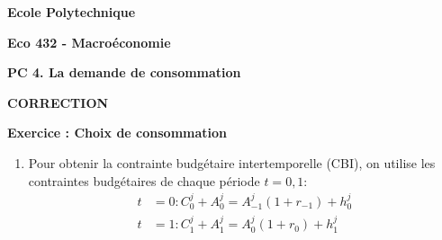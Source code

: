 \documentclass[a4paper,11pt]{article}
\begin{document}
\begin{center}
\textbf{Ecole Polytechnique}

\bigskip

\textbf{Eco 432 - Macroéconomie}

\bigskip

\textbf{PC 4. La demande de consommation}

\bigskip

\textbf{CORRECTION}
\end{center}


\bigskip


\noindent \textbf{Exercice : Choix de consommation}

\smallskip


\begin{enumerate}
\item  Pour obtenir la contrainte budgétaire intertemporelle (CBI), on utilise
les contraintes budgétaires de chaque période $t=0,1$:
\begin{align*}
t& =0:C_{0}^{j}+A_{0}^{j}=A_{-1}^{j}\left( 1+r_{-1}\right) + h^j_0 \\
t& =1:C_{1}^{j}+A_{1}^{j}=A_{0}^{j}\left( 1+r_{0}\right) + h^j_1 \\
\end{align*}

 


\end{enumerate}
\end{document}
